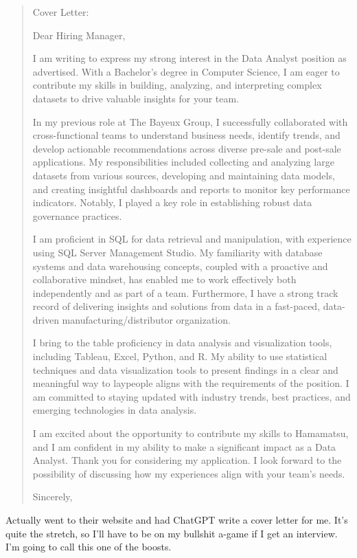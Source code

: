 \documentclass[
	letterpaper, %
	12pt, %
]{CSSullivanBusinessReport}
\begin{document}
\begin{quote}
	Cover Letter:

	Dear Hiring Manager,

	I am writing to express my strong interest in the Data Analyst position as advertised. With a Bachelor's degree in Computer Science, I am eager to contribute my skills in building, analyzing, and interpreting complex datasets to drive valuable insights for your team.

	In my previous role at The Bayeux Group, I successfully collaborated with cross-functional teams to understand business needs, identify trends, and develop actionable recommendations across diverse pre-sale and post-sale applications. My responsibilities included collecting and analyzing large datasets from various sources, developing and maintaining data models, and creating insightful dashboards and reports to monitor key performance indicators. Notably, I played a key role in establishing robust data governance practices.

	I am proficient in SQL for data retrieval and manipulation, with experience using SQL Server Management Studio. My familiarity with database systems and data warehousing concepts, coupled with a proactive and collaborative mindset, has enabled me to work effectively both independently and as part of a team. Furthermore, I have a strong track record of delivering insights and solutions from data in a fast-paced, data-driven manufacturing/distributor organization.

	I bring to the table proficiency in data analysis and visualization tools, including Tableau, Excel, Python, and R. My ability to use statistical techniques and data visualization tools to present findings in a clear and meaningful way to laypeople aligns with the requirements of the position. I am committed to staying updated with industry trends, best practices, and emerging technologies in data analysis.

	I am excited about the opportunity to contribute my skills to Hamamatsu, and I am confident in my ability to make a significant impact as a Data Analyst. Thank you for considering my application. I look forward to the possibility of discussing how my experiences align with your team's needs.

	Sincerely,

\end{quote}

Actually went to their website and had ChatGPT write a cover letter for me. It's quite the stretch, so I'll have to be on my bullshit a-game if I get an interview. I'm going to call this one of the boosts. 
\end{document}
